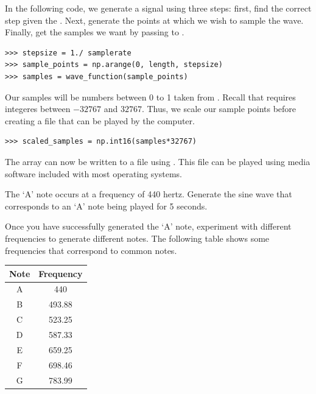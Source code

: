 In the following code, we generate a signal using three steps: first, find the correct step given the .
Next, generate the points at which we wish to sample the wave.
Finally, get the samples we want by passing  to .

\begin{lstlisting}
>>> stepsize = 1./ samplerate
>>> sample_points = np.arange(0, length, stepsize)
>>> samples = wave_function(sample_points)
\end{lstlisting}

Our samples will be numbers between 0 to 1 taken from .
Recall that  requires integeres between $-32767$ and $32767$.
Thus, we scale our sample points before creating a  file that can be played by the computer.

\begin{lstlisting}
>>> scaled_samples = np.int16(samples*32767)
\end{lstlisting}

The  array can now be written to a file using .
This file can be played using media software included with most operating systems.

\begin{problem}

The `A' note occurs at a frequency of 440 hertz.
Generate the sine wave that corresponds to an `A' note being played for 5 seconds.

Once you have successfully generated the `A' note, experiment with different frequencies to generate different notes.
The following table shows some frequencies that correspond to common notes.

\begin{center}
\begin{tabular}{|c|c|}
\hline
Note & Frequency \\
\hline
A & 440 \\
B & 493.88 \\
C & 523.25 \\
D & 587.33 \\
E & 659.25 \\
F & 698.46 \\
G & 783.99 \\
\hline
\end{tabular}
\end{center}

\end{problem}

